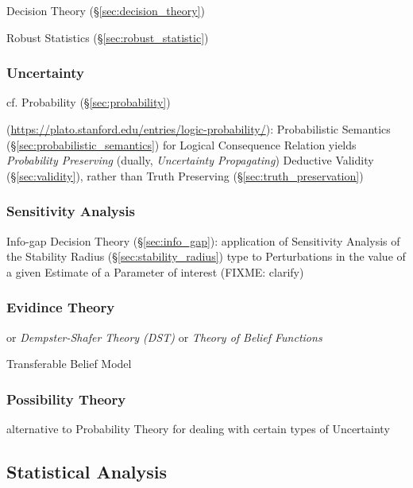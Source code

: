 \fist Decision Theory (\S\ref{sec:decision_theory})

\fist Robust Statistics (\S\ref{sec:robust_statistic})



\subsubsection{Uncertainty}\label{sec:uncertainty}

cf. Probability (\S\ref{sec:probability})

(\url{https://plato.stanford.edu/entries/logic-probability/}): Probabilistic
Semantics (\S\ref{sec:probabilistic_semantics}) for Logical Consequence Relation
yields \emph{Probability Preserving} (dually, \emph{Uncertainty Propagating})
Deductive Validity (\S\ref{sec:validity}), rather than Truth Preserving
(\S\ref{sec:truth_preservation})



\subsubsection{Sensitivity Analysis}\label{sec:sensitivity_analysis}

\fist Info-gap Decision Theory (\S\ref{sec:info_gap}): application of
Sensitivity Analysis of the Stability Radius (\S\ref{sec:stability_radius}) type
to Perturbations in the value of a given Estimate of a Parameter of interest
(FIXME: clarify)



\subsubsection{Evidince Theory}\label{sec:evidence_theory}

or \emph{Dempster-Shafer Theory (DST)} or \emph{Theory of Belief Functions}

Transferable Belief Model



\subsubsection{Possibility Theory}\label{sec:possibility_theory}

alternative to Probability Theory for dealing with certain types of Uncertainty



\subsection{Statistical Analysis}\label{sec:statistical_analysis}

